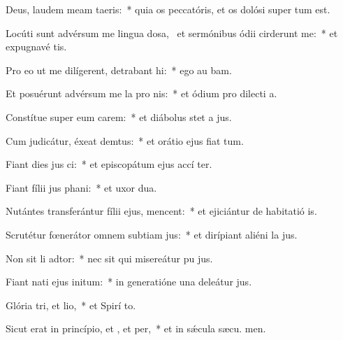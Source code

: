 \item Deus, laudem meam  taeris:~* quia os peccatóris, et os dolósi super  tum est.
\item Locúti sunt advérsum me lingua dosa,~\pscross{} et sermónibus ódii cirderunt me:~* et expugnavé  tis.
\item Pro eo ut me dilígerent, detrabant hi:~* ego au bam.
\item Et posuérunt advérsum me la pro nis:~* et ódium pro dilecti a.
\item Constítue super eum carem:~* et diábolus stet a  jus.
\item Cum judicátur, éxeat demtus:~* et orátio ejus fiat  tum.
\item Fiant dies jus ci:~* et episcopátum ejus accí ter.
\item Fiant fílii jus phani:~* et uxor  dua.
\item Nutántes transferántur fílii ejus,  mencent:~* et ejiciántur de habitatió is.
\item Scrutétur fœnerátor omnem subtiam jus:~* et dirípiant aliéni la jus.
\item Non sit li adtor:~* nec sit qui misereátur pu jus.
\item Fiant nati ejus  initum:~* in generatióne una deleátur  jus.
\item Glória tri, et lio,~* et Spirí to.
\item Sicut erat in princípio, et , et per,~* et in sǽcula sæcu. men.
